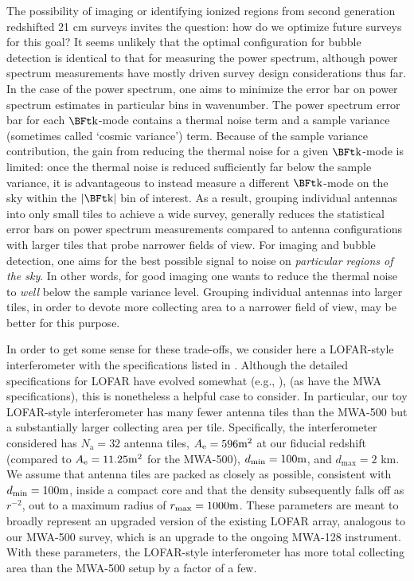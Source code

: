 The possibility of imaging or identifying ionized regions from second
generation redshifted 21 cm surveys invites the question: how do
we optimize future surveys for this goal? It seems unlikely that
the optimal configuration for bubble detection is identical to that
for measuring the power spectrum, although power spectrum measurements
have mostly driven survey design considerations thus far.
In the case of the power spectrum, one
aims to minimize the error bar on power spectrum estimates in 
particular bins in wavenumber. The power spectrum error bar for
each $\k$-mode contains a thermal noise term and a sample variance (sometimes
called `cosmic variance') term. Because of the sample variance contribution,
the gain from reducing the thermal noise for a given $\k$-mode is limited: once
the thermal noise is reduced sufficiently far below
the sample variance, it is advantageous to instead measure a different
$\k$-mode on the sky within the $|\k|$ bin of interest. As a result, grouping
individual antennas into only small tiles to achieve a wide survey, generally
reduces the statistical error bars on power spectrum measurements compared
to antenna configurations with larger tiles that probe narrower fields of view.
For imaging and bubble detection, one aims for the best possible
signal to noise on {\em particular regions of the sky}. In other words, for good
imaging one wants to reduce the thermal noise to {\em well} below the sample variance level.
Grouping individual antennas into larger tiles, in order
to devote more collecting area to a narrower field of view, may be better
for this purpose.

In order to get some sense for these trade-offs, we consider here
a LOFAR-style interferometer with the specifications
listed in \citet{McQuinn:2006et}. Although the detailed
specifications for LOFAR have evolved somewhat (e.g., \citealt{Zaroubi:2012cy}),
(as have the MWA specifications), this is nonetheless a helpful case to consider. In particular,
our toy LOFAR-style interferometer has many fewer antenna tiles than the
MWA-500 but a substantially larger collecting area per tile. Specifically, the interferometer
considered has $N_{\text{a}} =
32$ antenna tiles, $A_{\text{e}} = 596\meter^2$ at our fiducial redshift (compared
to $A_{\text{e}} = 11.25 \meter^2$ for the MWA-500), $d_{\min}
= 100\meter$, and $d_{\max} = 2$ km. We assume that antenna tiles are
packed as closely as possible, consistent with $d_{\min} = 100 \meter$,
inside a compact core and that the
density subsequently falls off as $r^{-2}$, out to a
maximum radius of $r_{\max} = 1000 \meter$. These parameters are
meant to broadly represent an upgraded version of the existing LOFAR array, analogous to our
MWA-500 survey, which is an upgrade to the ongoing MWA-128 instrument. With 
these parameters, the LOFAR-style interferometer has more total
collecting area than the MWA-500 setup by a factor of a
few. 

